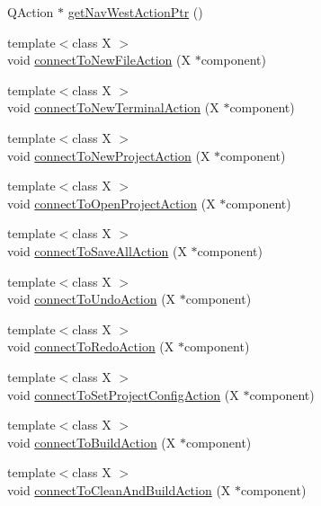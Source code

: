 \begin{DoxyCompactItemize}
Q\-Action $\ast$ \hyperlink{class_master_actions_af34890304ed29b9a0def25b5c3bbe1f3}{get\-Nav\-West\-Action\-Ptr} ()
\item 
{\footnotesize template$<$class X $>$ }\\void \hyperlink{class_master_actions_a24f67a69e013feac51a24a34d32f2c40}{connect\-To\-New\-File\-Action} (X $\ast$component)
\item 
{\footnotesize template$<$class X $>$ }\\void \hyperlink{class_master_actions_aeca9ddb448704bcc3a7e9ac3a66d5b57}{connect\-To\-New\-Terminal\-Action} (X $\ast$component)
\item 
{\footnotesize template$<$class X $>$ }\\void \hyperlink{class_master_actions_a7eb69b0a616b949086f7422394f6c881}{connect\-To\-New\-Project\-Action} (X $\ast$component)
\item 
{\footnotesize template$<$class X $>$ }\\void \hyperlink{class_master_actions_aa792c3936e0b0b4c016d01ad4a1c5803}{connect\-To\-Open\-Project\-Action} (X $\ast$component)
\item 
{\footnotesize template$<$class X $>$ }\\void \hyperlink{class_master_actions_ab859d0b5419ae5f17504e8fdd83be4be}{connect\-To\-Save\-All\-Action} (X $\ast$component)
\item 
{\footnotesize template$<$class X $>$ }\\void \hyperlink{class_master_actions_a6590f8772608e4d99efbf16ef9625b78}{connect\-To\-Undo\-Action} (X $\ast$component)
\item 
{\footnotesize template$<$class X $>$ }\\void \hyperlink{class_master_actions_a6077c09ff4426c4a99eaa33ff12f22e4}{connect\-To\-Redo\-Action} (X $\ast$component)
\item 
{\footnotesize template$<$class X $>$ }\\void \hyperlink{class_master_actions_a5e25d464651d37d48c7e6a4714130dd7}{connect\-To\-Set\-Project\-Config\-Action} (X $\ast$component)
\item 
{\footnotesize template$<$class X $>$ }\\void \hyperlink{class_master_actions_a9625507b1a412bd95bdc13ae54bc68a2}{connect\-To\-Build\-Action} (X $\ast$component)
\item 
{\footnotesize template$<$class X $>$ }\\void \hyperlink{class_master_actions_a86232c67d3599a28c6b5238eb6dd4e88}{connect\-To\-Clean\-And\-Build\-Action} (X $\ast$component)

\end{DoxyCompactItemize}
